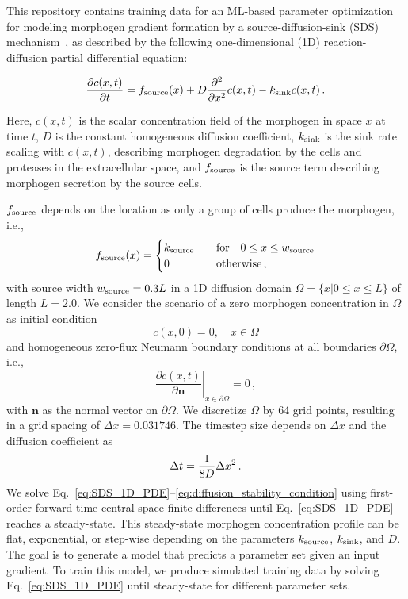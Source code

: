 \documentclass[11pt]{article}
\begin{document}
This repository contains training data for an ML-based parameter optimization for modeling morphogen gradient formation by a source-diffusion-sink (SDS) mechanism~\cite{Yu2009}, as described by the following one-dimensional (1D) reaction-diffusion partial differential equation:

\begin{equation}\label{eq:SDS_1D_PDE}
	\frac{\partial c(x,t)}{\partial t} = f_{\rm{source}}(x) + D\frac{\partial^2 }{\partial x^2}c(x,t) - k_{\rm{sink}}c(x,t)\,.
\end{equation}

Here, $c(x,t)$ is the scalar concentration field of the morphogen in space $x$ at time $t$, $D$ is the constant homogeneous diffusion coefficient, $k_{\rm{sink}}$ is the sink rate scaling with $c(x,t)$, describing morphogen degradation by the cells and proteases in the extracellular space, and $f_{\rm{source}}$ is the source term describing morphogen secretion by the source cells. 

$f_{\rm{source}}$ depends on the location as only a group of cells produce the morphogen, i.e.,
\begin{equation}\label{eq:source}
	f_{\rm{source}}(x) =
        \begin{cases}
        k_{\rm{source}} \quad & \text{for} \quad  0 \le x \le w_{\rm{source}}  \\
        0 & \rm{otherwise}\, ,
    \end{cases}  
\end{equation}
%
with source width $w_{\rm{source}} = 0.3 L$ in a 1D diffusion domain $\Omega = \{x | 0 \leq x \leq L\} $ of length $L=2.0$. We consider the scenario of a zero morphogen concentration in $\Omega$ as initial condition
%
\begin{equation}\label{eq:IC}
	c(x,0) = 0, \quad x \in \Omega
\end{equation}
%
and homogeneous zero-flux Neumann boundary conditions at all boundaries $\partial \Omega$, i.e.,
%
\begin{equation}\label{eq:no_flux_BCs}
    \left. \frac{\partial c(x, t)}{\partial \bm n} \right\rvert_{x \in \partial \Omega} = 0\,,
\end{equation}
with $\bm n$ as the normal vector on $\partial \Omega$. We discretize $\Omega$ by 64 grid points, resulting in a grid spacing of $\Delta x=0.031746$. The timestep size depends on $\Delta x$ and the diffusion coefficient as
%
\begin{equation}{\label{eq:diffusion_stability_condition}}
    \Delta t = \frac{1}{8  D}  \Delta x^{2}\, .
\end{equation}
%
We solve Eq.~\eqref{eq:SDS_1D_PDE}--\eqref{eq:diffusion_stability_condition} using first-order forward-time central-space finite differences until Eq.~\eqref{eq:SDS_1D_PDE} reaches a steady-state. This steady-state morphogen concentration profile can be flat, exponential, or step-wise depending on the parameters $k_{\rm{source}}$, $k_{\rm{sink}}$, and $D$. The goal is to generate a model that predicts a parameter set given an input gradient. To train this model, we produce simulated training data by solving Eq.~\eqref{eq:SDS_1D_PDE} until steady-state for different parameter sets.
\end{document}
